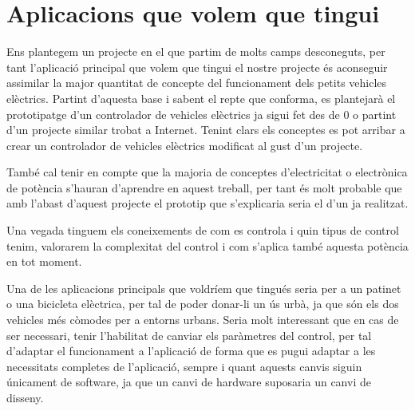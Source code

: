 \section{Aplicacions que volem que tingui}
Ens plantegem un projecte en el que partim de molts camps \newline desconeguts, per tant l'aplicació principal que volem que tingui el nostre projecte és aconseguir assimilar la major quantitat de concepte del funcionament dels petits vehicles elèctrics. Partint d'aquesta base i sabent el repte que conforma, es plantejarà el prototipatge d'un controlador de vehicles elèctrics ja sigui fet des de 0 o partint d'un projecte similar trobat a Internet. Tenint clars els conceptes es pot arribar a crear un controlador de vehicles elèctrics modificat al gust d'un projecte.

També cal tenir en compte que la majoria de conceptes d'electricitat o electrònica de potència s'hauran d'aprendre en aquest treball, per tant és molt probable que amb l'abast d'aquest projecte el prototip que \newline s'explicaria seria el d'un ja realitzat.

Una vegada tinguem els coneixements de com es controla i quin tipus de control tenim, valorarem la complexitat del control i com s'aplica també aquesta potència en tot moment.

Una de les aplicacions principals que voldríem que tingués seria per a un patinet o una bicicleta elèctrica, per tal de poder donar-li un ús urbà, ja que són els dos vehicles més còmodes per a entorns urbans. Seria molt interessant que en cas de ser necessari, tenir l'habilitat de canviar els paràmetres del control, per tal d'adaptar el funcionament a l'aplicació de forma que es pugui adaptar a les necessitats completes de l'aplicació, sempre i quant aquests canvis siguin únicament de software, ja que un canvi de hardware suposaria un canvi de disseny.

